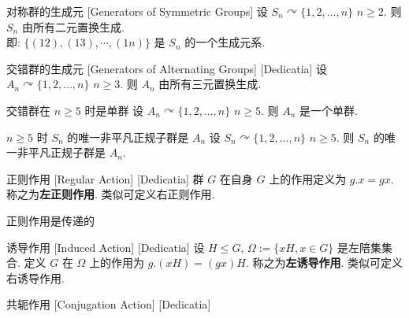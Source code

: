         \begin{ppt}
            {对称群的生成元}
            [Generators of Symmetric Groups]
            设 \(S_n\curvearrowright \{1,2,\ldots,n\}\) \(n\geq 2\). 则 \(S_n\) 由所有二元置换生成.\\
            即: \(\{(12), (13), \cdots, (1n)\}\) 是 \(S_n\) 的一个生成元系. 
        \end{ppt}

        \begin{ppt}
            {交错群的生成元}
            [Generators of Alternating Groups]
            [Dedicatia]
            设 \(A_n\curvearrowright \{1,2,\ldots,n\}\) \(n\geq 3\). 则 \(A_n\) 由所有三元置换生成.
        \end{ppt}

        \begin{ppt}
            {交错群在 \(n\geq 5\) 时是单群}
            设 \(A_n\curvearrowright \{1,2,\ldots,n\}\) \(n\geq 5\). 则 \(A_n\) 是一个单群.
        \end{ppt}

        \begin{crl}
            {\(n\geq 5\) 时 \(S_n\) 的唯一非平凡正规子群是 \(A_n\)}
            设 \(S_n\curvearrowright \{1,2,\ldots,n\}\) \(n\geq 5\). 则 \(S_n\) 的唯一非平凡正规子群是 \(A_n\).
        \end{crl}

        \begin{dfn}
            {正则作用}
            [Regular Action]
            [Dedicatia]
            群 \(G\) 在自身 \(G\) 上的作用定义为 \(g.x=gx\). 称之为\textbf{左正则作用}. 类似可定义右正则作用.
        \end{dfn}
        
        \begin{ppt}
            {正则作用是传递的}
        \end{ppt}

        \begin{dfn}
            {诱导作用}
            [Induced Action]
            [Dedicatia]
            设 \(H\leq G\), \(\Omega:=\{xH, x\in G\}\) 是左陪集集合. 定义 \(G\) 在 \(\Omega\) 上的作用为 \(g.(xH)=(gx)H\). 称之为\textbf{左诱导作用}. 类似可定义右诱导作用.
        \end{dfn}

        \begin{dfn}
            {共轭作用}
            [Conjugation Action]
            [Dedicatia]
        \end{dfn}

